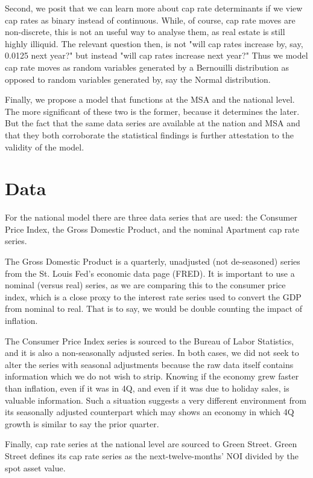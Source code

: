 Second, we posit that we can learn more about cap rate determinants if we view cap rates as binary instead of continuous. While, of course, cap rate moves are non-discrete, this is not an useful way to analyse them, as real estate is still highly illiquid. The relevant question then, is not "will cap rates increase by, say,  0.0125 next year?" but instead "will cap rates increase next year?" Thus we model cap rate moves as random variables generated by a Bernouilli distribution as opposed to random variables generated by, say the Normal distribution. 

Finally, we propose a model that functions at the MSA and the national level. The more significant of these two is the former, because it determines the later. But the fact that the same data series are available at the nation and MSA and that they both corroborate the statistical findings is further attestation to the validity of the model.

\section{Data}
For the national model there are three data series that are used: the Consumer Price Index, the Gross Domestic Product, and the nominal Apartment cap rate series. 

The Gross Domestic Product is a quarterly, unadjusted (not de-seasoned) series from the St. Louis Fed's economic data page (FRED). It is important to use a nominal (versus real) series, as we are comparing this to the consumer price index, which is a close proxy to the interest rate series used to convert the GDP from nominal to real. That is to say, we would be double counting the impact of inflation.

The Consumer Price Index series is sourced to the Bureau of Labor Statistics, and it is also a non-seasonally adjusted series. In both cases, we did not seek to alter the series with seasonal adjustments because the raw data itself contains information which we do not wish to strip. Knowing if the economy grew faster than inflation, even if it was in 4Q, and even if it was due to holiday sales, is valuable information. Such a situation suggests a very different environment from its seasonally adjusted counterpart which may shows an economy in which 4Q growth is similar to say the prior quarter.

Finally, cap rate series at the national level are sourced to Green Street. Green Street defines its cap rate series as the next-twelve-months' NOI divided by the spot asset value. 

